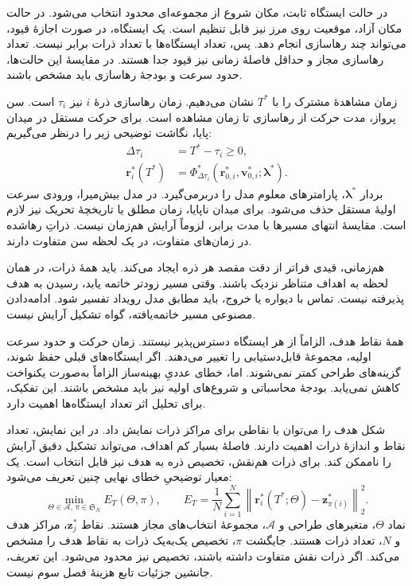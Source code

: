 در حالت ایستگاه ثابت، مکان شروع از مجموعه‌ای محدود انتخاب می‌شود.
در حالت مکان آزاد، موقعیت روی مرز نیز قابل تنظیم است.
یک ایستگاه، در صورت اجازهٔ قیود، می‌تواند چند رهاسازی انجام دهد.
پس، تعداد ایستگاه‌ها با تعداد ذرات برابر نیست.
تعداد رهاسازی مجاز و حداقل فاصلهٔ زمانی نیز قیود جدا هستند.
در مقایسهٔ این حالت‌ها، حدود سرعت و بودجهٔ رهاسازی باید مشخص باشند.

زمان مشاهدهٔ مشترک را با $T^{*}$ نشان می‌دهیم.
زمان رهاسازی ذرهٔ $i$ نیز $\tau_i$ است.
سن پرواز، مدت حرکت از رهاسازی تا زمان مشاهده است.
برای حرکت مستقل در میدان پایا، نگاشت توضیحی زیر را درنظر می‌گیریم:
\begin{equation}
\begin{aligned}
\Delta\tau_i&=T^{*}-\tau_i\geq0,\\
\mathbf{r}_i^{*}(T^{*})
&=\Phi^{*}_{\Delta\tau_i}
\left(\mathbf{r}_{0,i}^{*},\mathbf{v}_{0,i}^{*};
\boldsymbol{\lambda}^{*}\right).
\end{aligned}
\label{eq:lit-release-common-clock}
\end{equation}
بردار $\boldsymbol{\lambda}^{*}$، پارامترهای معلوم مدل را دربرمی‌گیرد.
در مدل بیش‌میرا، ورودی سرعت اولیهٔ مستقل حذف می‌شود.
برای میدان ناپایا، زمان مطلق یا تاریخچهٔ تحریک نیز لازم است.
مقایسهٔ انتهای مسیرها با مدت برابر، لزوماً آرایش هم‌زمان نیست.
ذراتِ رهاشده در زمان‌های متفاوت، در یک لحظه سن متفاوت دارند.

هم‌زمانی، قیدی فراتر از دقت مقصد هر ذره ایجاد می‌کند.
باید همهٔ ذرات، در همان لحظه به اهداف متناظر نزدیک باشند.
وقتی مسیر زودتر خاتمه یابد، رسیدن به هدف پذیرفته نیست.
تماس با دیواره یا خروج، باید مطابق مدل رویداد تفسیر شود.
ادامه‌دادن مصنوعی مسیر خاتمه‌یافته، گواه تشکیل آرایش نیست.

همهٔ نقاط هدف، الزاماً از هر ایستگاه دسترس‌پذیر نیستند.
زمان حرکت و حدود سرعت اولیه، مجموعهٔ قابل‌دستیابی را تغییر می‌دهند.
اگر ایستگاه‌های قبلی حفظ شوند، گزینه‌های طراحی کمتر نمی‌شوند.
اما، خطای عددیِ بهینه‌ساز الزاماً به‌صورت یکنواخت کاهش نمی‌یابد.
بودجهٔ محاسباتی و شروع‌های اولیه نیز باید مشخص باشند.
این تفکیک، برای تحلیل اثر تعداد ایستگاه‌ها اهمیت دارد.

\label{sec:lit-multiparticle-formation-constraints}

شکل هدف را می‌توان با نقاطی برای مراکز ذرات نمایش داد.
در این نمایش، تعداد نقاط و اندازهٔ ذرات اهمیت دارند.
فاصلهٔ بسیار کم اهداف، می‌تواند تشکیل دقیق آرایش را ناممکن کند.
برای ذرات هم‌نقش، تخصیص ذره به هدف نیز قابل انتخاب است.
یک معیار توضیحیِ خطای نهایی چنین تعریف می‌شود:
\begin{equation}
\min_{\Theta\in\mathcal{A},\,\pi\in\mathfrak{S}_N}
E_T(\Theta,\pi),
\qquad
E_T=\frac{1}{N}\sum_{i=1}^{N}
\left\|\mathbf{r}_i^{*}(T^{*};\Theta)
-\mathbf{z}^{*}_{\pi(i)}\right\|_2^2.
\label{eq:lit-formation-assignment-objective}
\end{equation}
نماد $\Theta$، متغیرهای طراحی و $\mathcal{A}$، مجموعهٔ انتخاب‌های مجاز هستند.
نقاط $\mathbf{z}^{*}_j$، مراکز هدف و $N$، تعداد ذرات هستند.
جایگشت $\pi$، تخصیص یک‌به‌یک ذرات به نقاط هدف را مشخص می‌کند.
اگر ذرات نقش متفاوت داشته باشند، تخصیص نیز محدود می‌شود.
این تعریف، جانشین جزئیات تابع هزینهٔ فصل سوم نیست.

